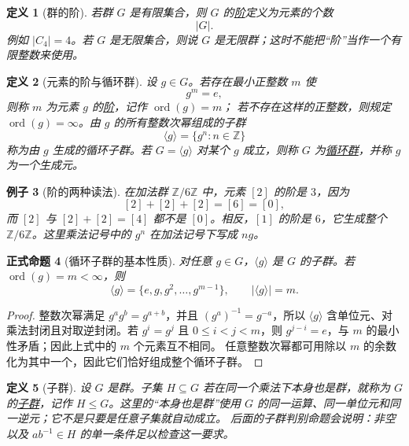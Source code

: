 \documentclass[UTF8,fontset=none,a4paper,11pt]{ctexart}
\theoremstyle{foundation-definition}
\newtheorem{definition}{定义}[section]
\theoremstyle{foundation-theorem}
\theoremstyle{foundation-proposition}
\newtheorem{proposition}[definition]{正式命题}
\theoremstyle{foundation-example}
\newtheorem{example}[definition]{例子}
\theoremstyle{foundation-remark}
\theoremstyle{foundation-theorem}
\newcommand{\term}[2]{\hyperref[#1]{#2}}
\begin{document}
\begin{definition}[群的阶]\label{def:group-order}
若群 \(G\) 是有限集合，则 \(G\) 的\term{def:group-order}{阶}定义为元素的个数
\[
|G|.
\]
例如 \(|C_4|=4\)。若 \(G\) 是无限集合，则说 \(G\) 是无限群；这时不能把“阶”当作一个有限整数来使用。
\end{definition}

\begin{definition}[元素的阶与循环群]\label{def:element-order}\label{def:cyclic-group}
设 \(g\in G\)。若存在最小正整数 \(m\) 使
\[
g^m=e,
\]
则称 \(m\) 为元素 \(g\) 的\term{def:element-order}{阶}，记作 \(\operatorname{ord}(g)=m\)；
若不存在这样的正整数，则规定 \(\operatorname{ord}(g)=\infty\)。由 \(g\) 的所有整数次幂组成的子群
\[
\langle g\rangle=\{g^n:n\in\mathbb Z\}
\]
称为由 \(g\) 生成的循环子群。若 \(G=\langle g\rangle\) 对某个 \(g\) 成立，则称
\(G\) 为\term{def:cyclic-group}{循环群}，并称 \(g\) 为一个生成元。
\end{definition}

\begin{example}[阶的两种读法]
在加法群 \(\mathbb Z/6\mathbb Z\) 中，元素 \([2]\) 的阶是 \(3\)，因为
\[
[2]+[2]+[2]=[6]=[0],
\]
而 \([2]\) 与 \([2]+[2]=[4]\) 都不是 \([0]\)。相反，\([1]\) 的阶是 \(6\)，它生成整个
\(\mathbb Z/6\mathbb Z\)。这里乘法记号中的 \(g^n\) 在加法记号下写成 \(ng\)。
\end{example}

\begin{proposition}[循环子群的基本性质]\label{prop:cyclic-subgroup}
对任意 \(g\in G\)，\(\langle g\rangle\) 是 \(G\) 的子群。若
\(\operatorname{ord}(g)=m<\infty\)，则
\[
\langle g\rangle=\{e,g,g^2,\ldots,g^{m-1}\},
\qquad
|\langle g\rangle|=m.
\]
\end{proposition}

\begin{proof}
整数次幂满足 \(g^ag^b=g^{a+b}\)，并且 \((g^a)^{-1}=g^{-a}\)，所以
\(\langle g\rangle\) 含单位元、对乘法封闭且对取逆封闭。若 \(g^i=g^j\) 且
\(0\leq i<j<m\)，则 \(g^{j-i}=e\)，与 \(m\) 的最小性矛盾；因此上式中的 \(m\) 个元素互不相同。
任意整数次幂都可用除以 \(m\) 的余数化为其中一个，因此它们恰好组成整个循环子群。
\end{proof}

\begin{definition}[子群]\label{def:subgroup}
设 \(G\) 是群。子集 \(H\subseteq G\) 若在同一个乘法下本身也是群，就称为
\(G\) 的\term{def:subgroup}{子群}，记作 \(H\leq G\)。这里的“本身也是群”使用
\(G\) 的同一运算、同一单位元和同一逆元；它不是只要是任意子集就自动成立。
后面的子群判别命题会说明：非空以及 \(ab^{-1}\in H\) 的单一条件足以检查这一要求。
\end{definition}
\end{document}
